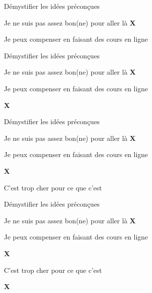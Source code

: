 \documentclass{beamer}
\begin{document}
\begin{frame}{Démystifier les idées préconçues}
\begin{itemize}
    \item Je ne suis pas assez bon(ne) pour aller là \Large{\textbf{\color{red}X}}
    \normalsize{\item Je peux compenser en faisant des cours en ligne}
\end{itemize}
\end{frame}


\begin{frame}{Démystifier les idées préconçues}
\begin{itemize}
    \item Je ne suis pas assez bon(ne) pour aller là \Large{\textbf{\color{red}X}}
    \normalsize{\item Je peux compenser en faisant des cours en ligne} \Large{\textbf{\color{red}X}}
\end{itemize}
\end{frame}


\begin{frame}{Démystifier les idées préconçues}
\begin{itemize}
    \item Je ne suis pas assez bon(ne) pour aller là \Large{\textbf{\color{red}X}}
    \normalsize{\item Je peux compenser en faisant des cours en ligne} \Large{\textbf{\color{red}X}}
    \normalsize{\item C'est trop cher pour ce que c'est}
\end{itemize}
\end{frame}

\begin{frame}{Démystifier les idées préconçues}
\begin{itemize}
    \item Je ne suis pas assez bon(ne) pour aller là \Large{\textbf{\color{red}X}}
    \normalsize{\item Je peux compenser en faisant des cours en ligne} \Large{\textbf{\color{red}X}}
    \normalsize{\item C'est trop cher pour ce que c'est} \Large{\textbf{\color{red}X}}
\end{itemize}
\end{frame}
\end{document}
